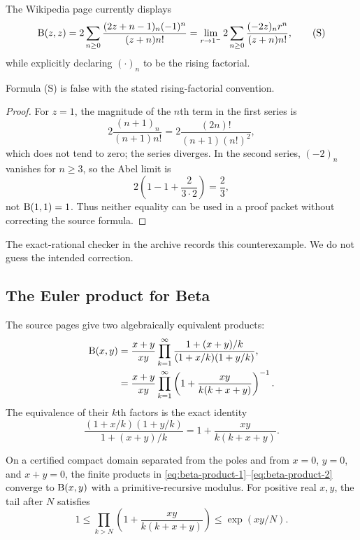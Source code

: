 The Wikipedia page currently displays
\[
 \mathrm B(z,z)=2\sum_{n\ge0}
 \frac{(2z+n-1)_n(-1)^n}{(z+n)n!}
 =\lim_{r\to1^-}2\sum_{n\ge0}
 \frac{(-2z)_n r^n}{(z+n)n!},
 \tag{S}
\]
while explicitly declaring $(\cdot)_n$ to be the rising factorial.

\begin{warning}[Counterexample at $z=1$]\label{warn:false-series}
Formula (S) is false with the stated rising-factorial convention.
\end{warning}

\begin{proof}
For $z=1$, the magnitude of the $n$th term in the first series is
\[
 2\frac{(n+1)_n}{(n+1)n!}
 =2\frac{(2n)!}{(n+1)(n!)^2},
\]
which does not tend to zero; the series diverges.  In the second series, $(-2)_n$ vanishes for $n\ge3$, so the Abel limit is
\[
 2\left(1-1+\frac{2}{3\cdot2}\right)
 =\frac23,
\]
not $\mathrm B(1,1)=1$.  Thus neither equality can be used in a proof packet without correcting the source formula.
\end{proof}

The exact-rational checker in the archive records this counterexample.  We do not guess the intended correction.

\subsection{The Euler product for Beta}

The source pages give two algebraically equivalent products:
\begin{align}
 \mathrm B(x,y)
 &=\frac{x+y}{xy}
 \prod_{k=1}^{\infty}
 \frac{1+(x+y)/k}{(1+x/k)(1+y/k)},
 \label{eq:beta-product-1}\\
 &=\frac{x+y}{xy}
 \prod_{k=1}^{\infty}
 \left(1+\frac{xy}{k(k+x+y)}\right)^{-1}.
 \label{eq:beta-product-2}
\end{align}
The equivalence of their $k$th factors is the exact identity
\[
 \frac{(1+x/k)(1+y/k)}{1+(x+y)/k}
 =1+\frac{xy}{k(k+x+y)}.
\]

\begin{theorem}\label{thm:beta-product}
On a certified compact domain separated from the poles and from $x=0$, $y=0$, and $x+y=0$, the finite products in
\eqref{eq:beta-product-1}--\eqref{eq:beta-product-2} converge to $\mathrm B(x,y)$ with a primitive-recursive modulus.
For positive real $x,y$, the tail after $N$ satisfies
\[
 1\le
 \prod_{k>N}\left(1+\frac{xy}{k(k+x+y)}\right)
 \le\exp(xy/N).
\]
\end{theorem}

